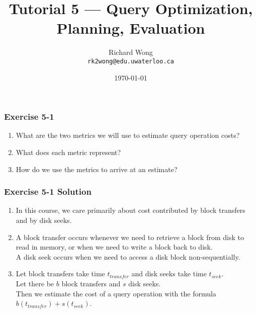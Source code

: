

\title{Tutorial 5 --- Query Optimization, Planning, Evaluation }

\author{Richard Wong \\ \small \texttt{rk2wong@edu.uwaterloo.ca}}
\date{\today}




\begin{frame}
  \titlepage

\end{frame}


\begin{frame}
\frametitle{Exercise 5-1}

\begin{enumerate}
  \item What are the two metrics we will use to estimate query operation costs?
  \item What does each metric represent?
  \item How do we use the metrics to arrive at an estimate?
\end{enumerate}

\end{frame}


\begin{frame}
\frametitle{Exercise 5-1 Solution}

\begin{enumerate}
  \item In this course, we care primarily about cost contributed by block transfers and by disk seeks.
  \item A block transfer occurs whenever we need to retrieve a block from disk to read in memory, or when we need to write a block back to disk. \\
    A disk seek occurs when we need to access a disk block non-sequentially.
  \item Let block transfers take time $t_{transfer}$ and disk seeks take time $t_{seek}$. \\
    Let there be $b$ block transfers and $s$ disk seeks. \\
    Then we estimate the cost of a query operation with the formula $b(t_{transfer}) + s(t_{seek})$.
\end{enumerate}

\end{frame}



